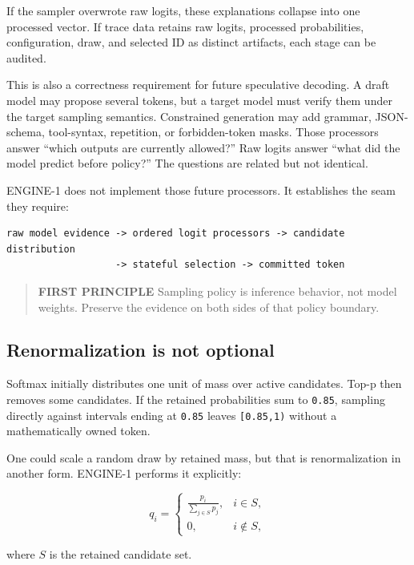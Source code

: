 \documentclass[
  10pt,
]{article}
\begin{document}
If the sampler overwrote raw logits, these explanations collapse into
one processed vector. If trace data retains raw logits, processed
probabilities, configuration, draw, and selected ID as distinct
artifacts, each stage can be audited.

This is also a correctness requirement for future speculative decoding.
A draft model may propose several tokens, but a target model must verify
them under the target sampling semantics. Constrained generation may add
grammar, JSON-schema, tool-syntax, repetition, or forbidden-token masks.
Those processors answer ``which outputs are currently allowed?'' Raw
logits answer ``what did the model predict before policy?'' The
questions are related but not identical.

ENGINE-1 does not implement those future processors. It establishes the
seam they require:

\begin{verbatim}
raw model evidence -> ordered logit processors -> candidate distribution
                   -> stateful selection -> committed token
\end{verbatim}

\begin{quote}
\textbf{FIRST PRINCIPLE} Sampling policy is inference behavior, not
model weights. Preserve the evidence on both sides of that policy
boundary.
\end{quote}

\subsection{Renormalization is not
optional}\label{renormalization-is-not-optional}

Softmax initially distributes one unit of mass over active candidates.
Top-p then removes some candidates. If the retained probabilities sum to
\texttt{0.85}, sampling directly against intervals ending at
\texttt{0.85} leaves \texttt{{[}0.85,1)} without a mathematically owned
token.

One could scale a random draw by retained mass, but that is
renormalization in another form. ENGINE-1 performs it explicitly:

\[
q_i=
\begin{cases}
\displaystyle\frac{p_i}{\sum_{j\in S}p_j}, & i\in S,\\[6pt]
0, & i\notin S,
\end{cases}
\]

where \(S\) is the retained candidate set.
\end{document}
